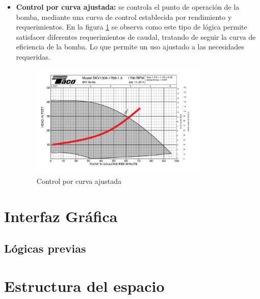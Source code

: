 \begin{itemize}
\item \textbf{Control por curva ajustada:}
se controla el punto de operación de la bomba, mediante una curva de control establecida por rendimiento y requerimientos. En la figura \ref{fig:CurvaControlTacoControl} se observa como este tipo de lógica permite satisfacer diferentes requerimientos de caudal, tratando de seguir la curva de eficiencia de la bomba. Lo que permite un uso
ajustado a las necesidades requeridas. 

\begin{figure}[H]
    \centering
    \includegraphics[width=0.80\textwidth]{2_MainMatter/Capitulo2/Imagenes/CurvacontrolTacoCurva.png}
    \caption{Control por curva ajustada}
    \label{fig:CurvaControlTacoControl}
\end{figure}

\end{itemize}

\section{Interfaz Gráfica}
\subsection{Lógicas previas}
\section{Estructura del espacio}
